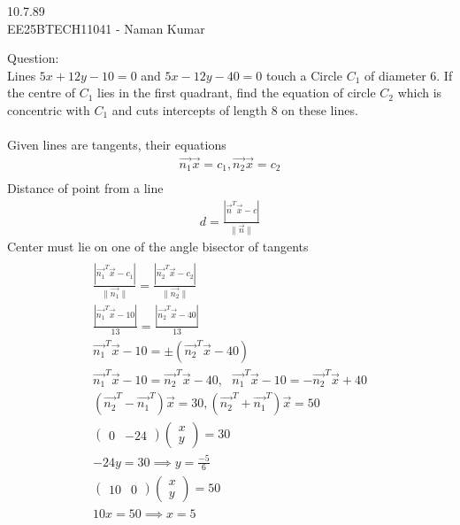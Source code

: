 \documentclass[a5paper,10pt]{article}
\author{EE25BTECH11041-Naman Kumar }
\begin{document}
\begin{center}
    \huge{10.7.89}\\
    \large{EE25BTECH11041 - Naman Kumar}
\end{center}
Question:\\
Lines $5x + 12y - 10 = 0$ and $5x -12y - 40 = 0$ touch a Circle $C_1$ of diameter 6. If the centre of $C_1$ lies in the first quadrant, find the equation of circle $C_2$ which is concentric with $C_1$ and cuts intercepts of length 8 on these lines.\\
\solution \\
Given lines are tangents, their equations
\begin{align}
    \vec{n_1}\vec{x}=c_1,\vec{n_2}\vec{x}=c_2
\end{align}
\begin{align}  

\end{align}
Distance of point from a line
\begin{align}
    d=\frac{|\vec{n}^T\vec{x}-c|}{\lVert \vec{n} \rVert}
\end{align}
Center must lie on one of the angle bisector of tangents
\begin{align}
\\
    \frac{|\vec{n_1}^T\vec{x}-c_1|}{\lVert \vec{n_1}\rVert}=\frac{|\vec{n_2}^T\vec{x}-c_2|}{\lVert \vec{n_2} \rVert}\\
\frac{|\vec{n_1}^T\vec{x}-10|}{13}=\frac{|\vec{n_2}^T\vec{x}-40|}{13}\\
\vec{n_1}^T\vec{x}-10=\pm (\vec{n_2}^T\vec{x}-40)\\
\vec{n_1}^T\vec{x}-10=\vec{n_2}^T\vec{x}-40,\text{       }\vec{n_1}^T\vec{x}-10=-\vec{n_2}^T\vec{x}+40\\
(\vec{n_2}^T-\vec{n_1}^T)\vec{x}=30,(\vec{n_2}^T+\vec{n_1}^T)\vec{x}=50\\
\begin{pmatrix}0&-24\end{pmatrix}\begin{pmatrix}x\\y\end{pmatrix}=30\\
-24y=30\implies y=\frac{-5}{6}\\
\begin{pmatrix}10&0\end{pmatrix}\begin{pmatrix}x\\y\end{pmatrix}=50\\
10x=50\implies x=5
\end{align}
\end{document}
